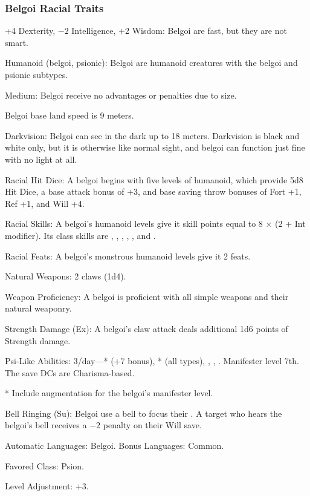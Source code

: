 \subsubsection{Belgoi Racial Traits}
\begin{itemize*}
	\item +4 Dexterity, $-2$ Intelligence, +2 Wisdom: Belgoi are fast, but they are not smart.
    \item Humanoid (belgoi, psionic): Belgoi are humanoid creatures with the belgoi and psionic subtypes.
	\item Medium: Belgoi receive no advantages or penalties due to size.
    \item Belgoi base land speed is 9 meters.
    \item Darkvision: Belgoi can see in the dark up to 18 meters. Darkvision is black and white only, but it is otherwise like normal sight, and belgoi can function just fine with no light at all.
    \item Racial Hit Dice: A belgoi begins with five levels of humanoid, which provide 5d8 Hit Dice, a base attack bonus of +3, and base saving throw bonuses of Fort +1, Ref +1, and Will +4.
    \item Racial Skills: A belgoi's humanoid levels give it skill points equal to 8 $\times$ (2 + Int modifier). Its class skills are , , , , , and .
    \item Racial Feats: A belgoi's monstrous humanoid levels give it 2 feats.
    \item Natural Weapons: 2 claws (1d4).
    \item Weapon Proficiency: A belgoi is proficient with all simple weapons and their natural weaponry.
    \item Strength Damage (Ex): A belgoi's claw attack deals additional 1d6 points of Strength damage.
    \item Psi-Like Abilities: 3/day---* (+7 bonus), * (all types), , , . Manifester level 7th. The save DCs are Charisma-based.

    * Include augmentation for the belgoi's manifester level.
    \item Bell Ringing (Su): Belgoi use a bell to focus their . A  target who hears the belgoi's bell receives a $-2$ penalty on their Will save.
    \item Automatic Languages: Belgoi. Bonus Languages: Common.
    \item Favored Class: Psion.
    \item Level Adjustment: +3.
\end{itemize*}
